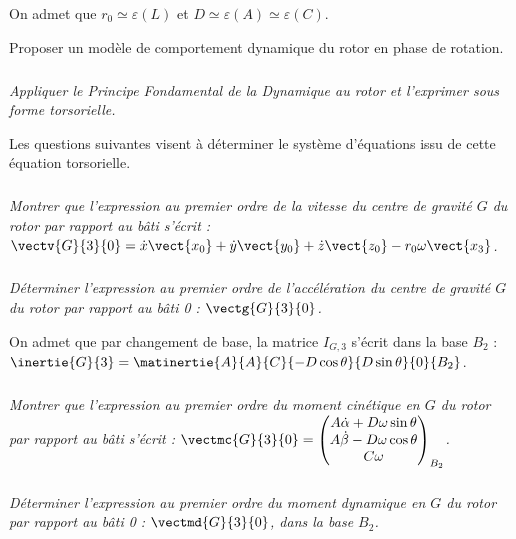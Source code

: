 \begin{multicols}{2}
On admet que $r_0\simeq \varepsilon(L)$ et $D\simeq \varepsilon(A)\simeq \varepsilon(C)$.

\begin{obj}
Proposer un modèle de comportement dynamique du rotor en phase de rotation.
\end{obj}

\subparagraph{}
\textit{Appliquer le Principe Fondamental de la Dynamique au rotor et l'exprimer
sous forme torsorielle.}
\ifprof
\begin{corrige}
\end{corrige}
\else
\fi



Les questions suivantes visent à déterminer le système d'équations issu de cette
équation torsorielle.

\subparagraph{}
\textit{Montrer que%
l'expression au premier ordre de la vitesse du centre de gravité $G$ du rotor par rapport au bâti
s'écrit : $\vectv{G}{3}{0}=\dot{x}\vect{x_0}+\dot{y}\vect{y_0}+\dot{z}\vect{z_0}-r_0\omega \vect{x_3}$.}
\ifprof
\begin{corrige}
\end{corrige}
\else
\fi


\subparagraph{}
\textit{Déterminer%
l'expression au premier
ordre de l'accélération du centre de gravité $G$ du rotor par rapport au
bâti 0 : $\vectg{G}{3}{0}$.}
\ifprof
\begin{corrige}
\end{corrige}
\else
\fi

On admet que par changement de base, la matrice $I_{G,3}$ s'écrit dans la base $B_2$ :
$\inertie{G}{3}=\matinertie{A}{A}{C}{-D\cos\theta}{D\sin\theta}{0}{B_2}$.



\subparagraph{}
\textit{Montrer que %
l'expression au premier ordre du moment cinétique en $G$ du rotor par rapport au bâti s'écrit :
$\vectmc{G}{3}{0}=\begin{pmatrix} A\dot{\alpha}+D\omega\sin\theta  \\ A\dot{ \beta }-D\omega\cos\theta \\ C\omega \end{pmatrix}_{B_2}$.
}
\ifprof
\begin{corrige}
\end{corrige}
\else
\fi


\subparagraph{}
\textit{Déterminer %
l'expression au premier ordre du moment dynamique en $G$ du rotor par rapport au bâti 0 : $\vectmd{G}{3}{0}$, dans la base $B_2$.}
\ifprof
\begin{corrige}
\end{corrige}
\else
\fi


\end{multicols}
